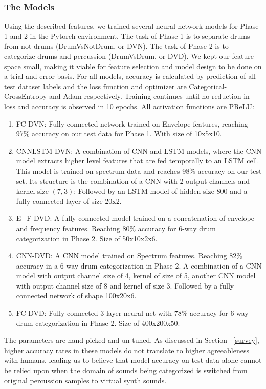 \documentclass[\main/thesis.tex]{subfiles}
\begin{document}
\subsubsection{The Models}
Using the described features, we trained several neural network models for Phase 1 and 2 in the Pytorch environment. The task of Phase 1 is to separate drums from not-drums (DrumVsNotDrum, or DVN). The task of Phase 2 is to categorize drums and percussion (DrumVsDrum, or DVD). We kept our feature space small, making it viable for feature selection and model design to be done on a trial and error basis. For all models, accuracy is calculated by prediction of all test dataset labels and the loss function and optimizer are Categorical-CrossEntropy and Adam respectively. Training continues until no reduction in loss and accuracy is observed in 10 epochs.  All activation functions are PReLU:
\begin {enumerate}
\item FC-DVN: Fully connected network trained on Envelope features, reaching 97\% accuracy on our test data for Phase 1. With size of 10x5x10.
\item CNNLSTM-DVN: A combination of CNN and LSTM models, where the CNN model extracts higher level features that are fed temporally to an LSTM cell. This model is trained on spectrum data and reaches 98\% accuracy on our test set. Its structure is the combination of a CNN with 2 output channels and kernel size $(7,3)$; Followed by an LSTM model of hidden size 800 and a fully connected layer of size 20x2.
\item E+F-DVD: A fully connected model trained on a concatenation of envelope and frequency features. Reaching 80\% accuracy for 6-way drum categorization in Phase 2. Size of 50x10x2x6.
\item CNN-DVD: A CNN model trained on Spectrum features. Reaching 82\% accuracy in a 6-way drum categorization in Phase 2. A combination of a CNN model with output channel size of 4, kernel of size of 5, another CNN model with output channel size of 8 and kernel of size 3. Followed by a fully connected network of shape 100x20x6.
\item FC-DVD: Fully connected 3 layer neural net with 78\% accuracy for 6-way drum categorization in Phase 2. Size of 400x200x50.
\end{enumerate}
The parameters are hand-picked and un-tuned. As discussed in Section ~\ref{survey}, higher accuracy rates in these models do not translate to higher agreeableness with humans. leading us to believe that model accuracy on test data alone cannot be relied upon when the domain of sounds 
being categorized is switched from original percussion samples to virtual synth sounds.
\end{document}
